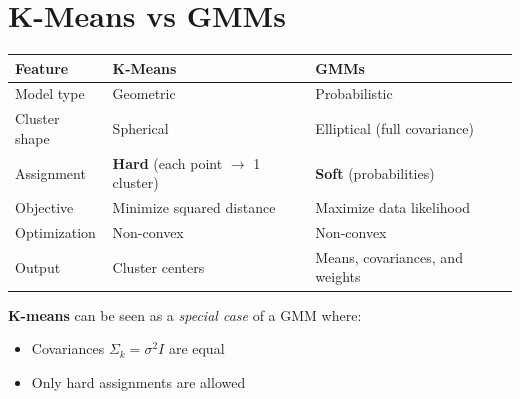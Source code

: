 \documentclass[11pt]{article}
\begin{document}
\section*{K-Means vs GMMs}

\begin{center}
	\begin{tabular}{|l|l|l|}
		\hline
		\textbf{Feature} & \textbf{K-Means}                                   & \textbf{GMMs}                   \\
		\hline
		Model type       & Geometric                                          & Probabilistic                   \\
		\hline
		Cluster shape    & Spherical                                          & Elliptical (full covariance)    \\
		\hline
		Assignment       & \textbf{Hard} (each point $\rightarrow$ 1 cluster) & \textbf{Soft} (probabilities)   \\
		\hline
		Objective        & Minimize squared distance                          & Maximize data likelihood        \\
		\hline
		Optimization     & Non-convex                                         & Non-convex                      \\
		\hline
		Output           & Cluster centers                                    & Means, covariances, and weights \\
		\hline
	\end{tabular}
\end{center}

\vspace{1em}

\noindent\textbf{K-means} can be seen as a \textit{special case} of a GMM where:
\begin{itemize}
	\item Covariances $\Sigma_k = \sigma^2 I$ are equal
	\item Only hard assignments are allowed
\end{itemize}
\end{document}
